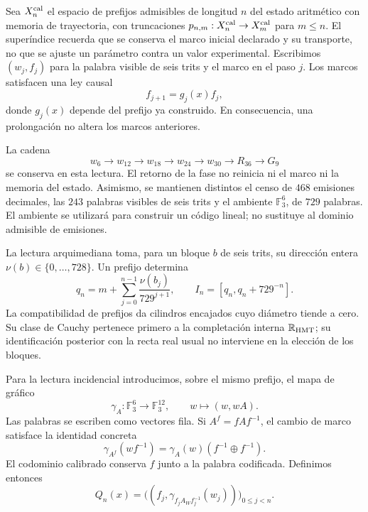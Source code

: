 Sea $X_n^{\rm cal}$ el espacio de prefijos admisibles de longitud $n$ del
estado aritmético con memoria de trayectoria, con truncaciones
$p_{n,m}:X_n^{\rm cal}\to X_m^{\rm cal}$ para $m\leq n$. El superíndice
recuerda que se conserva el marco inicial declarado y su transporte, no
que se ajuste un parámetro contra un valor experimental. Escribimos
$(w_j,f_j)$ para la palabra visible de seis trits y el marco en el paso
$j$. Los marcos satisfacen una ley causal
\[
 f_{j+1}=g_j(x)f_j,
\]
donde $g_j(x)$ depende del prefijo ya construido. En consecuencia, una
prolongación no altera los marcos anteriores.

La cadena
\[
 w_6\longrightarrow w_{12}\longrightarrow w_{18}
 \longrightarrow w_{24}\longrightarrow w_{30}
 \longrightarrow R_{36}\longrightarrow G_9
\]
se conserva en esta lectura. El retorno de la fase no reinicia ni el
marco ni la memoria del estado. Asimismo, se mantienen distintos el
censo de $468$ emisiones decimales, las $243$ palabras visibles de seis
trits y el ambiente $\mathbb F_3^6$, de $729$ palabras. El ambiente se
utilizará para construir un código lineal; no sustituye al dominio
admisible de emisiones.

La lectura arquimediana toma, para un bloque $b$ de seis trits, su
dirección entera $\nu(b)\in\{0,\ldots,728\}$. Un prefijo determina
\[
 q_n=m+\sum_{j=0}^{n-1}\frac{\nu(b_j)}{729^{j+1}},
 \qquad I_n=[q_n,q_n+729^{-n}].
\]
La compatibilidad de prefijos da cilindros encajados cuyo diámetro tiende
a cero. Su clase de Cauchy pertenece primero a la completación interna
$\mathbb R_{\rm HMT}$; su identificación posterior con la recta real
usual no interviene en la elección de los bloques.

Para la lectura incidencial introducimos, sobre el mismo prefijo, el
mapa de gráfico
\begin{equation}
 \gamma_A:\mathbb F_3^6\longrightarrow\mathbb F_3^{12},
 \qquad w\longmapsto(w,wA).
 \label{exc:gamma}
\end{equation}
Las palabras se escriben como vectores fila. Si $A^f=fAf^{-1}$, el
cambio de marco satisface la identidad concreta
\begin{equation}
 \gamma_{A^f}(wf^{-1})
   =\gamma_A(w)(f^{-1}\oplus f^{-1}).
 \label{exc:covariancia}
\end{equation}
El codominio calibrado conserva $f$ junto a la palabra codificada.
Definimos entonces
\begin{equation}
 Q_n(x)=\bigl((f_j,\gamma_{f_jA_Wf_j^{-1}}(w_j))\bigr)_{0\leq j<n}.
 \label{exc:qn}
\end{equation}

